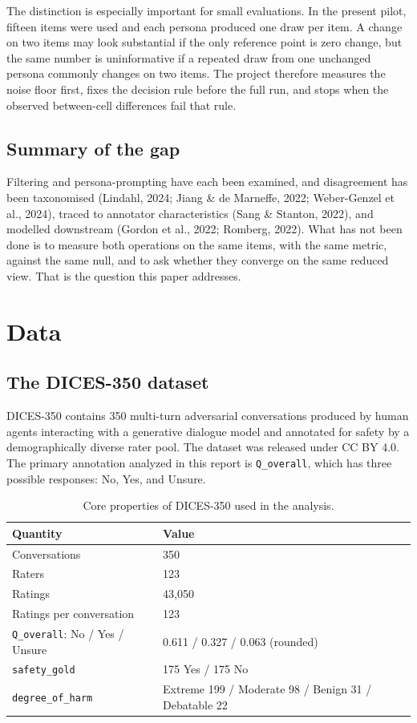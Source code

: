 \documentclass[11pt,a4paper]{article}
\begin{document}
The distinction is especially important for small evaluations. In the present pilot, fifteen
items were used and each persona produced one draw per item. A change on two items may look
substantial if the only reference point is zero change, but the same number is uninformative if a
repeated draw from one unchanged persona commonly changes on two items. The project therefore
measures the noise floor first, fixes the decision rule before the full run, and stops when the
observed between-cell differences fail that rule.
\subsection{Summary of the gap}

Filtering and persona-prompting have each been examined, and disagreement has been taxonomised
(Lindahl, 2024; Jiang \& de Marneffe, 2022; Weber-Genzel et al., 2024), traced to annotator
characteristics (Sang \& Stanton, 2022), and modelled downstream (Gordon et al., 2022;
Romberg, 2022). What has not been done is to measure both operations on the same items, with the
same metric, against the same null, and to ask whether they converge on the same reduced view.
That is the question this paper addresses.



\section{Data}

\subsection{The DICES-350 dataset}

DICES-350 contains 350 multi-turn adversarial conversations produced by human agents interacting
with a generative dialogue model and annotated for safety by a demographically diverse rater
pool. The dataset was released under CC BY 4.0. The primary annotation analyzed in this report is
\texttt{Q\_overall}, which has three possible responses: No, Yes, and Unsure.

\begin{table}[htbp]
\centering
\caption{Core properties of DICES-350 used in the analysis.}
\label{tab:core}
\small\begin{tabular}{ll}
\toprule
\textbf{Quantity} & \textbf{Value} \\
\midrule
Conversations & 350 \\
Raters & 123 \\
Ratings & 43,050 \\
Ratings per conversation & 123 \\
\texttt{Q\_overall}: No / Yes / Unsure & 0.611 / 0.327 / 0.063 (rounded) \\
\texttt{safety\_gold} & 175 Yes / 175 No \\
\texttt{degree\_of\_harm} & Extreme 199 / Moderate 98 / Benign 31 / Debatable 22 \\
\bottomrule
\end{tabular}
\end{table}
\end{document}
